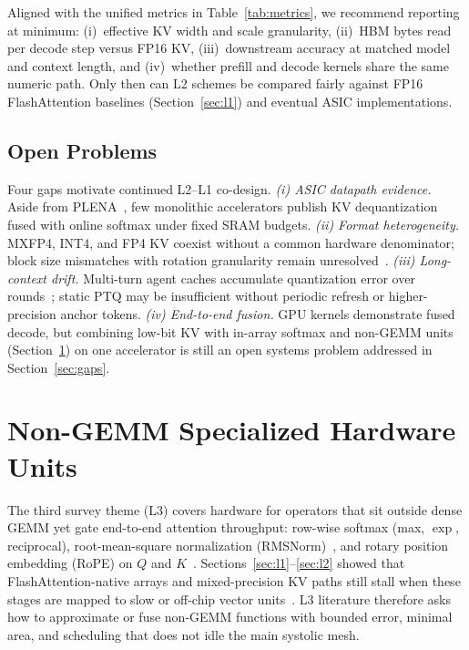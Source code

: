 \documentclass[conference]{IEEEtran}
\begin{document}
Aligned with the unified metrics in Table~\ref{tab:metrics}, we recommend reporting at minimum:
(i)~effective KV width and scale granularity,
(ii)~HBM bytes read per decode step versus FP16 KV,
(iii)~downstream accuracy at matched model and context length, and
(iv)~whether prefill and decode kernels share the same numeric path.
Only then can L2 schemes be compared fairly against FP16 FlashAttention baselines (Section~\ref{sec:l1}) and eventual ASIC implementations.

\subsection{Open Problems}
\label{sec:l2-open}

Four gaps motivate continued L2--L1 co-design.
\emph{(i) ASIC datapath evidence.} Aside from PLENA~\cite{plena2025}, few monolithic accelerators publish KV dequantization fused with online softmax under fixed SRAM budgets.
\emph{(ii) Format heterogeneity.} MXFP4, INT4, and FP4 KV coexist without a common hardware denominator; block size mismatches with rotation granularity remain unresolved~\cite{batquant2026,sawint42026}.
\emph{(iii) Long-context drift.} Multi-turn agent caches accumulate quantization error over rounds~\cite{ultraquant2026}; static PTQ may be insufficient without periodic refresh or higher-precision anchor tokens.
\emph{(iv) End-to-end fusion.} GPU kernels demonstrate fused decode, but combining low-bit KV with in-array softmax and non-GEMM units (Section~\ref{sec:l3}) on one accelerator is still an open systems problem addressed in Section~\ref{sec:gaps}.

\section{Non-GEMM Specialized Hardware Units}
\label{sec:l3}

The third survey theme (L3) covers hardware for operators that sit outside dense GEMM yet gate end-to-end attention throughput: row-wise softmax (max, $\exp$, reciprocal), root-mean-square normalization (RMSNorm)~\cite{zhang2019root}, and rotary position embedding (RoPE) on $Q$ and $K$~\cite{su2024roformer}.
Sections~\ref{sec:l1}--\ref{sec:l2} showed that FlashAttention-native arrays and mixed-precision KV paths still stall when these stages are mapped to slow or off-chip vector units~\cite{wang2023cosa,desa2025,lin2025systolicattention}.
L3 literature therefore asks how to approximate or fuse non-GEMM functions with bounded error, minimal area, and scheduling that does not idle the main systolic mesh.
\end{document}
